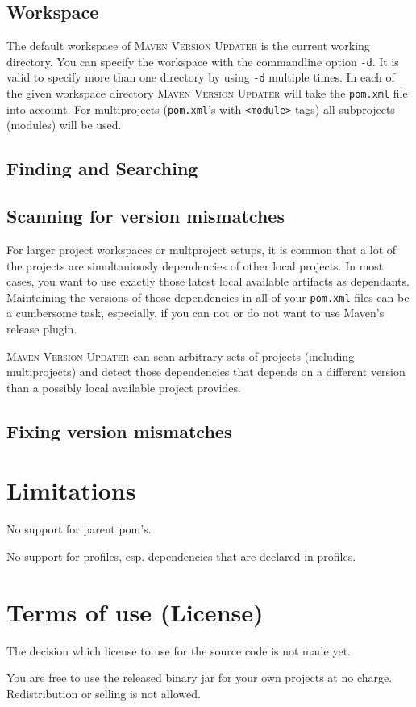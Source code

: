 \documentclass[a4paper,11pt,english,oneside,halfparskip]{scrartcl}
\newcommand{\code}[1]{\texttt{#1}}
\newcommand{\MVU}{\textsc{\small{}Maven Version Updater}}
\newcommand{\pom}{\code{pom.xml}}
\begin{document}
\subsection{Workspace}

The default workspace of \MVU{} is the current working directory. You can specify the workspace with the commandline option \code{-d}. It is valid to specify more than one directory by using \code{-d} multiple times. In each of the given workspace directory \MVU{} will take the \pom{} file into account. For multiprojects (\pom's with \code{<module>} tags) all subprojects (modules) will be used.

\subsection{Finding and Searching}


\subsection{Scanning for version mismatches}

For larger project workspaces or multproject setups, it is common that a lot of the projects are simultaniously dependencies of other local projects. In most cases, you want to use exactly those latest local available artifacts as dependants. Maintaining the versions of those dependencies in all of your \pom{} files can be a cumbersome task, especially, if you can not or do not want to use Maven's release plugin.

\MVU{} can scan arbitrary sets of projects (including multiprojects) and detect those dependencies that depends on a different version than a possibly local available project provides.



\subsection{Fixing version mismatches}

\section{Limitations}

No support for parent pom's.

No support for profiles, esp. dependencies that are declared in profiles.


\section{Terms of use (License)}

The decision which license to use for the source code is not made yet. 

You are free to use the released binary jar for your own projects at no charge. Redistribution or selling is not allowed.
\end{document}
